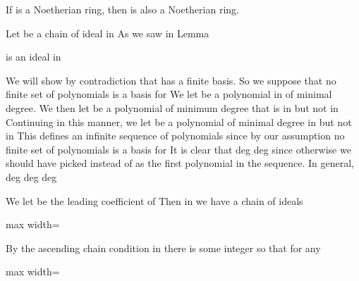 \documentclass[11pt,oneside]{article}
\begin{document}
\begin{BookBody}

 If  is a Noetherian ring, then  is also a Noetherian ring.

 Let  be a chain of ideal in  As we saw in Lemma 

\noindent is an ideal in 

We will show by contradiction that  has a finite basis. So we suppose that no finite set of polynomials is a basis for  We let  be a polynomial in  of minimal degree. We then let  be a polynomial of minimum degree that is in  but not in  Continuing in this manner, we let  be a polynomial of minimal degree in  but not in  This defines an infinite sequence of polynomials since by our assumption no finite set of polynomials is a basis for  It is clear that deg deg since otherwise we should have picked  instead of  as the first polynomial in the sequence. In general, deg deg deg

We let  be the leading coefficient of  Then in  we have a chain of ideals

\begin{center}\begin{adjustbox}{max width=\linewidth}\end{adjustbox}\end{center}

\noindent By the ascending chain condition in  there is some integer  so that for any 

\begin{center}\begin{adjustbox}{max width=\linewidth}\end{adjustbox}\end{center}


\end{BookBody}
\end{document}
